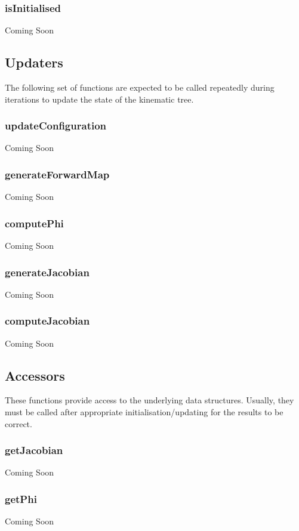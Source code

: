 \documentclass[12pt,a4paper,onecolumn]{article}
\begin{document}
\subsubsection*{isInitialised}
Coming Soon

\subsection{Updaters}
The following set of functions are expected to be called repeatedly during iterations to update the state of the kinematic tree.

\subsubsection*{updateConfiguration}
Coming Soon

\subsubsection*{generateForwardMap}
Coming Soon

\subsubsection*{computePhi}
Coming Soon

\subsubsection*{generateJacobian}
Coming Soon

\subsubsection*{computeJacobian}
Coming Soon

\subsection{Accessors}
These functions provide access to the underlying data structures. Usually, they must be called after appropriate initialisation/updating for the results to be correct.

\subsubsection*{getJacobian}
Coming Soon

\subsubsection*{getPhi}
Coming Soon
\end{document}
